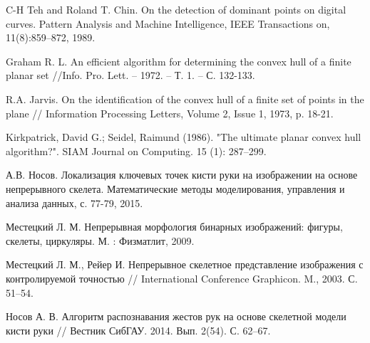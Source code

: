 \begin{thebibliography}{99}
C-H Teh and Roland T. Chin. On the detection of dominant points on
digital curves. Pattern Analysis and Machine Intelligence, IEEE
Transactions on, 11(8):859–872, 1989.

Graham R. L. An efficient algorithm for determining the
convex hull of a finite planar set //Info. Pro. Lett. –
1972. – Т. 1. – С. 132-133.

R.A. Jarvis. On the identification of the convex hull of a finite set of
points in the plane // Information Processing Letters, Volume 2,
Issue 1, 1973, p. 18-21.

Kirkpatrick, David G.; Seidel, Raimund (1986). "The ultimate planar
convex hull algorithm?". SIAM Journal on Computing. 15 (1): 287–299.

А.В. Носов. Локализация ключевых точек кисти руки на изображении на
основе непрерывного скелета. Математические методы моделирования,
управления и анализа данных, с. 77-79, 2015.

Местецкий Л. М. Непрерывная морфология бинарных изображений: фигуры,
скелеты, циркуляры. М. : Физматлит, 2009.

Местецкий Л. М., Рейер И. Непрерывное скелетное представление 
изображения с контролируемой точностью // International Conference
Graphicon. M., 2003. С. 51–54.

Носов А. В. Алгоритм распознавания жестов
рук на основе скелетной модели кисти руки // Вестник
СибГАУ. 2014. Вып. 2(54). С. 62–67.


\end{thebibliography}

